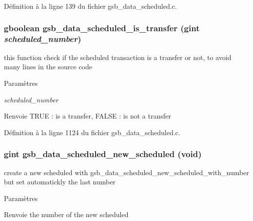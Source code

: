 Définition à la ligne 139 du fichier gsb\_\-data\_\-scheduled.c.

\subsubsection[{gsb\_\-data\_\-scheduled\_\-is\_\-transfer}]{\setlength{\rightskip}{0pt plus 5cm}gboolean gsb\_\-data\_\-scheduled\_\-is\_\-transfer (gint {\em scheduled\_\-number})}\label{gsb__data__scheduled_8h_ac1e3380ad4b688fb30af2fe5bbe28b5d}
this function check if the scheduled transaction is a transfer or not, to avoid many lines in the source code


\begin{DoxyParams}{Paramètres}
\item[{\em scheduled\_\-number}]\end{DoxyParams}
\begin{DoxyReturn}{Renvoie}
TRUE : is a transfer, FALSE : is not a transfer 
\end{DoxyReturn}


Définition à la ligne 1124 du fichier gsb\_\-data\_\-scheduled.c.

\subsubsection[{gsb\_\-data\_\-scheduled\_\-new\_\-scheduled}]{\setlength{\rightskip}{0pt plus 5cm}gint gsb\_\-data\_\-scheduled\_\-new\_\-scheduled (void)}\label{gsb__data__scheduled_8h_a2ee4e80b44acc9dfebb787bb5e99b79f}
create a new scheduled with gsb\_\-data\_\-scheduled\_\-new\_\-scheduled\_\-with\_\-number but set automatickly the last number


\begin{DoxyParams}{Paramètres}
\item[{\em }]\end{DoxyParams}
\begin{DoxyReturn}{Renvoie}
the number of the new scheduled 
\end{DoxyReturn}


